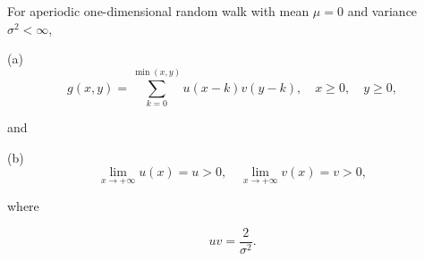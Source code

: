 For aperiodic one-dimensional random walk with mean $\mu = 0$ and variance $\sigma^2 < \infty$,

(a) $$g(x,y) = \sum_{k=0}^{\min(x,y)} u(x-k)v(y-k), \quad x \geq 0, \quad y \geq 0,$$

and

(b) $$\lim_{x \to +\infty} u(x) = u > 0, \quad \lim_{x \to +\infty} v(x) = v > 0,$$

where

$$uv = \frac{2}{\sigma^2}.$$
